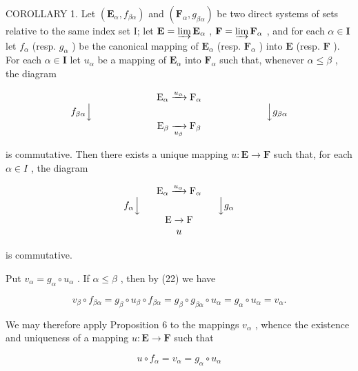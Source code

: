 COROLLARY 1. Let \((\mathbf{E}_{\alpha}, f_{\beta \alpha})\) and \((\mathbf{F}_{\alpha}, g_{\beta \alpha})\) be two direct systems of sets relative to the same index set I; let \(\mathbf{E} = \varinjlim \mathbf{E}_{\alpha}\) , \(\mathbf{F} = \varinjlim \mathbf{F}_{\alpha}\) , and for each \(\alpha \in \mathbf{I}\) let \(f_{\alpha}\) (resp. \(g_{\alpha}\) ) be the canonical mapping of \(\mathbf{E}_{\alpha}\) (resp. \(\mathbf{F}_{\alpha}\) ) into \(\mathbf{E}\) (resp. \(\mathbf{F}\) ). For each \(\alpha \in \mathbf{I}\) let \(u_{\alpha}\) be a mapping of \(\mathbf{E}_{\alpha}\) into \(\mathbf{F}_{\alpha}\) such that, whenever \(\alpha \leqslant \beta\) , the diagram

\[
\begin{array}{c} \mathrm{E} _ {\alpha} \xrightarrow {u _ {\alpha}} \mathrm{F} _ {\alpha} \\ f _ {\beta \alpha} \Big \downarrow \qquad \qquad \qquad \qquad \qquad \qquad \qquad \qquad \qquad \Big \downarrow g _ {\beta \alpha} \\ \mathrm{E} _ {\beta} \xrightarrow [ u _ {\beta} ]{} \mathrm{F} _ {\beta} \end{array}
\]

is commutative. Then there exists a unique mapping \(u: \mathbf{E} \to \mathbf{F}\) such that, for each \(\alpha \in I\) , the diagram

\[
\begin{array}{c} \mathrm{E} _ {\alpha} \xrightarrow {u _ {\alpha}} \mathrm{F} _ {\alpha} \\ f _ {\alpha} \Big \downarrow \qquad \qquad \qquad \qquad \Big \downarrow g _ {\alpha} \\ \mathrm{E} \xrightarrow {} \mathrm{F} \\ u \end{array}
\]

is commutative.

Put \(v_{\alpha} = g_{\alpha} \circ u_{\alpha}\) . If \(\alpha \leqslant \beta\) , then by (22) we have

\[
v _ {\beta} \circ f _ {\beta \alpha} = g _ {\beta} \circ u _ {\beta} \circ f _ {\beta \alpha} = g _ {\beta} \circ g _ {\beta \alpha} \circ u _ {\alpha} = g _ {\alpha} \circ u _ {\alpha} = v _ {\alpha}.
\]

We may therefore apply Proposition 6 to the mappings \(v_{\alpha}\) , whence the existence and uniqueness of a mapping \(u: \mathbf{E} \to \mathbf{F}\) such that

\[
u \circ f _ {\alpha} = v _ {\alpha} = g _ {\alpha} \circ u _ {\alpha}
\]


